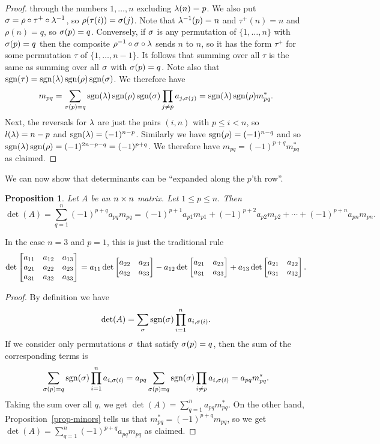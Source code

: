 \documentclass[reqno]{amsart}
\newtheorem{proposition}[theorem]{Proposition}
\theoremstyle{definition}
\begin{document}
\begin{proof}
 through the numbers $1,\dotsc,n$ excluding $\lambda(n)=p$.  We also put
 $\sigma=\rho\circ\tau^+\circ\lambda^{-1}$, so $\rho(\tau(i))=\sigma(j)$.  Note
 that $\lambda^{-1}(p)=n$ and $\tau^+(n)=n$ and $\rho(n)=q$, so
 $\sigma(p)=q$.  Conversely, if $\sigma$ is any permutation of
 $\{1,\dotsc,n\}$ with $\sigma(p)=q$ then the composite
 $\rho^{-1}\circ\sigma\circ\lambda$ sends $n$ to $n$, so it has the form
 $\tau^+$ for some permutation $\tau$ of $\{1,\dotsc,n-1\}$.  It follows
 that summing over all $\tau$ is the same as summing over all $\sigma$
 with $\sigma(p)=q$.  Note also that
 $\operatorname{sgn}(\tau)=\operatorname{sgn}(\lambda)\operatorname{sgn}(\rho)\operatorname{sgn}(\sigma)$.  We therefore have
 \[ m_{pq}
     = \sum_{\sigma(p)=q} \operatorname{sgn}(\lambda)\operatorname{sgn}(\rho)\operatorname{sgn}(\sigma)
        \prod_{j\neq p} a_{j,\sigma(j)}
     = \operatorname{sgn}(\lambda)\operatorname{sgn}(\rho) m^*_{pq}.
 \]
 Next, the reversals for $\lambda$ are just the pairs $(i,n)$ with $p\leq
 i<n$, so $l(\lambda)=n-p$ and $\operatorname{sgn}(\lambda)=(-1)^{n-p}$.  Similarly we have
 $\operatorname{sgn}(\rho)=(-1)^{n-q}$ and so
 $\operatorname{sgn}(\lambda)\operatorname{sgn}(\rho)=(-1)^{2n-p-q}=(-1)^{p+q}$.  We therefore have
 $m_{pq}=(-1)^{p+q}m^*_{pq}$ as claimed.
\end{proof}

We can now show that determinants can be ``expanded along the $p$'th
row''.

\begin{proposition}\label{prop-det-expand}
 Let $A$ be an $n\times n$ matrix.  Let $1 \leq p \leq n$.
 Then
 \[ \det(A) = \sum_{q=1}^n (-1)^{p+q}a_{pq}m_{pq} =
     (-1)^{p+1} a_{p1} m_{p1} + (-1)^{p+2} a_{p2}m_{p2} + \dotsb + (-1)^{p+n} a_{pn}m_{pn}.
 \]
\end{proposition}

In the case $n=3$ and $p=1$, this is just the traditional rule
\[ \det\left[\begin{matrix} a_{11} & a_{12} & a_{13} \\
            a_{21} & a_{22} & a_{23} \\
            a_{31} & a_{32} & a_{33} \end{matrix}\right] =
     a_{11} \det\left[\begin{matrix} a_{22} & a_{23} \\ a_{32} & a_{33} \end{matrix}\right]
    -a_{12} \det\left[\begin{matrix} a_{21} & a_{23} \\ a_{31} & a_{33} \end{matrix}\right]
    +a_{13} \det\left[\begin{matrix} a_{21} & a_{22} \\ a_{31} & a_{32} \end{matrix}\right].
\]

\begin{proof}
 By definition we have
 \[ \det(A) = \sum_\sigma \operatorname{sgn}(\sigma)\prod_{i=1}^n a_{i,\sigma(i)}. \]
 If we consider only permutations $\sigma$ that satisfy $\sigma(p)=q$, then
 the sum of the corresponding terms is
 \[ \sum_{\sigma(p)=q} \operatorname{sgn}(\sigma)\prod_{i=1}^n a_{i,\sigma(i)}
     = a_{pq} \sum_{\sigma(p)=q} \operatorname{sgn}(\sigma)\prod_{i\neq p} a_{i,\sigma(i)}
     = a_{pq} m^*_{pq}.
 \]
 Taking the sum over all $q$, we get
 $\det(A)=\sum_{q=1}^n a_{pq}m^*_{pq}$.  On the other hand,
 Proposition~\ref{prop-minors} tells us that
 $m^*_{pq}=(-1)^{p+q}m_{pq}$, so we get
 $\det(A)=\sum_{q=1}^n (-1)^{p+q}a_{pq}m_{pq}$ as claimed.
\end{proof}
\end{document}
